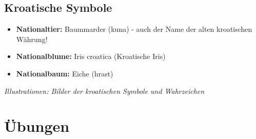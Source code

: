 \begin{culture}
\subsection*{Kroatische Symbole}

\begin{itemize}
    \item \textbf{Nationaltier:} Baummarder (kuna) - auch der Name der alten kroatischen Währung!
    \item \textbf{Nationalblume:} Iris croatica (Kroatische Iris)
    \item \textbf{Nationalbaum:} Eiche (hrast)
\end{itemize}

\textit{Illustrationen: Bilder der kroatischen Symbole und Wahrzeichen}
\end{culture}

\section{Übungen}

